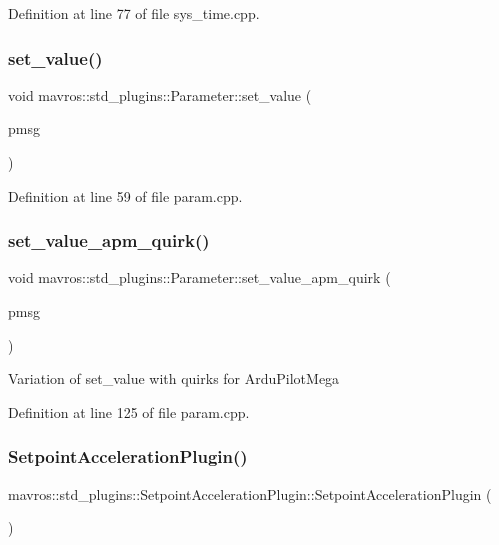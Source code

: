 Definition at line 77 of file sys\+\_\+time.\+cpp.

\mbox{\label{group__plugin_gaacaefc75948fab6cb140c8fbe6a9398e}} 
\subsubsection{\texorpdfstring{set\_value()}{set\_value()}}
{\footnotesize\ttfamily void mavros\+::std\+\_\+plugins\+::\+Parameter\+::set\+\_\+value (\begin{DoxyParamCaption}\item[{mavlink\+::common\+::msg\+::\+P\+A\+R\+A\+M\+\_\+\+V\+A\+L\+UE \&}]{pmsg }\end{DoxyParamCaption})\hspace{0.3cm}{\ttfamily [inline]}}



Definition at line 59 of file param.\+cpp.

\mbox{\label{group__plugin_ga3dbec960ba82630bd31abb9dcca666c8}} 
\subsubsection{\texorpdfstring{set\_value\_apm\_quirk()}{set\_value\_apm\_quirk()}}
{\footnotesize\ttfamily void mavros\+::std\+\_\+plugins\+::\+Parameter\+::set\+\_\+value\+\_\+apm\+\_\+quirk (\begin{DoxyParamCaption}\item[{mavlink\+::common\+::msg\+::\+P\+A\+R\+A\+M\+\_\+\+V\+A\+L\+UE \&}]{pmsg }\end{DoxyParamCaption})\hspace{0.3cm}{\ttfamily [inline]}}

Variation of set\+\_\+value with quirks for Ardu\+Pilot\+Mega 

Definition at line 125 of file param.\+cpp.

\mbox{\label{group__plugin_gadb07b9fc791c21aa306f0f5a92533eef}} 
\subsubsection{\texorpdfstring{SetpointAccelerationPlugin()}{SetpointAccelerationPlugin()}}
{\footnotesize\ttfamily mavros\+::std\+\_\+plugins\+::\+Setpoint\+Acceleration\+Plugin\+::\+Setpoint\+Acceleration\+Plugin (\begin{DoxyParamCaption}{ }\end{DoxyParamCaption})\hspace{0.3cm}{\ttfamily [inline]}}



